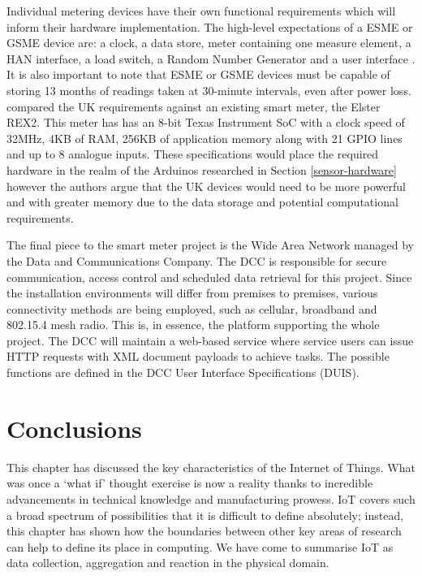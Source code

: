       Individual metering devices have their own functional requirements which will inform their hardware implementation. The high-level expectations of a ESME or GSME device are: a clock, a data store, meter containing one measure element, a HAN interface, a load switch, a Random Number Generator and a user interface \citep{smets:2014}. It is also important to note that ESME or GSME devices must be capable of storing 13 months of readings taken at 30-minute intervals, even after power loss. \citet{SMUK:2012} compared the UK requirements against an existing smart meter, the Elster REX2. This meter has has an 8-bit Texas Instrument SoC with a clock speed of 32MHz, 4KB of RAM, 256KB of application memory along with 21 GPIO lines and up to 8 analogue inputs. These specifications would place the required hardware in the realm of the Arduinos researched in Section \ref{sensor-hardware} however the authors argue that the UK devices would need to be more powerful and with greater memory due to the data storage and potential computational requirements.

      The final piece to the smart meter project is the Wide Area Network managed by the Data and Communications Company. The DCC is responsible for secure communication, access control and scheduled data retrieval for this project. Since the installation environments will differ from premises to premises, various connectivity methods are being employed, such as cellular, broadband and 802.15.4 mesh radio. This is, in essence, the platform supporting the whole project. The DCC will maintain a web-based service where service users can issue HTTP requests with XML document payloads to achieve tasks. The possible functions are defined in the DCC User Interface Specifications (DUIS).

  \section{Conclusions}
    This chapter has discussed the key characteristics of the Internet of Things. What was once a `what if' thought exercise is now a reality thanks to incredible advancements in technical knowledge and manufacturing prowess. IoT covers such a broad spectrum of possibilities that it is difficult to define absolutely; instead, this chapter has shown how the boundaries between other key areas of research can help to define its place in computing. We have come to summarise IoT as data collection, aggregation and reaction in the physical domain.


